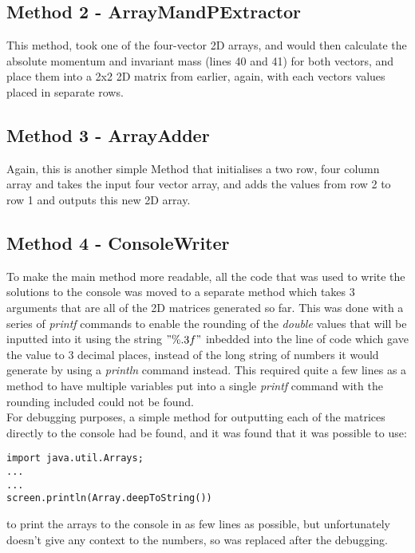 \documentclass{article}
\begin{document}
\begin{multicols}{2}
			\subsection{Method 2 - ArrayMandPExtractor}
			This method, took one of the four-vector 2D arrays, and would then calculate the absolute momentum and invariant mass (lines 40 and 41) for both vectors, and place them into a 2x2 2D matrix from earlier, again, with each vectors values placed in separate rows.
			\subsection{Method 3 - ArrayAdder}
			Again, this is another simple Method that initialises a two row, four column array and takes the input four vector array, and adds the values from row 2 to row 1 and outputs this new 2D array.
			\subsection{Method 4 - ConsoleWriter}
			To make the main method more readable, all the code that was used to write the solutions to the console was moved to a separate method which takes 3 arguments that are all of the 2D matrices generated so far. This was done with a series of \textit{printf} commands to enable the rounding of the \textit{double} values that will be inputted into it using the string $ "\%.3f"$ inbedded into the line of code which gave the value to 3 decimal places, instead of the long string of numbers it would generate by using a \textit{println} command instead. This required quite a few lines as a method to have multiple variables put into a single \textit{printf} command with the rounding included could not be found. \\ \indent For debugging purposes, a simple method for outputting each of the matrices directly to the console had be found, and it was found that it was possible to use:
			\begin{lstlisting}
import java.util.Arrays;
...
...
screen.println(Array.deepToString())
			\end{lstlisting}
			to print the arrays to the console in as few lines as possible, but unfortunately doesn't give any context to the numbers, so was replaced after the debugging.

\end{multicols}
\end{document}
